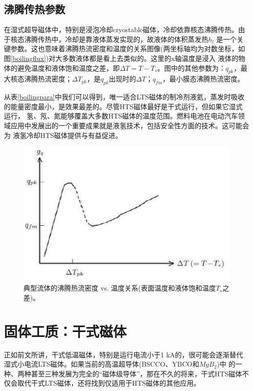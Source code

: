 \subsection*{沸腾传热参数}
在湿式超导磁体中，特别是浸泡冷却cryostable磁体，冷却依靠核态沸腾传热。由于核态沸腾传热中，冷却是靠液体蒸发实现的，故液体的体积蒸发热$h_l$
是一个关键参数。这也意味着沸腾热流密度和温度的关系图像(两坐标轴均为对数坐标，如图\ref{boilingflux})对大多数液体都是看上去类似的。这里的x轴温度是浸入
液体的物体的避免温度和液体饱和温度之差，即$\Delta T=T-T_s$。图中的其他参数为：$q_{pk}$，最大核态沸腾热流密度；$\Delta T_{pk}$，是$q_{pk}$出现时的$\Delta T$；$q_{fm}$，最小膜态沸腾热流密度。

从表\ref{boilingpara}中我们可以得到，唯一适合LTS磁体的制冷剂液氦，蒸发时吸收的能量密度最小，是效果最差的。尽管HTS磁体最好是干式运行，但如果它湿式运行，
氢、氖、氮能够覆盖大多数HTS磁体的温度范围。燃料电池在电动汽车领域应用中发展出的一个重要成果就是液氢技术，包括安全性方面的技术。这可能会为
液氢冷却HTS磁体提供与有益促进。

\begin{figure}
  \centering
 \includegraphics[scale=0.8]{chpt4/figs/fig4.1.eps}
  \caption{典型流体的沸腾热流密度 vs. 温度关系(表面温度和液体饱和温度$T_s$之差)。}
\end{figure}

\section{固体工质：干式磁体}
正如前文所讲，干式低温磁体，特别是运行电流小于1 kA的，很可能会逐渐替代湿式小电流LTS磁体。如果当前的高温超导体(BSCCO、YBCO和$MgB_2$)中
的一种、两种甚至三种发展为完全的“磁体级导体”，那在不久的将来，干式HTS磁体不仅会取代干式LTS磁体，还将找到仅适用于HTS磁体的其他应用。
